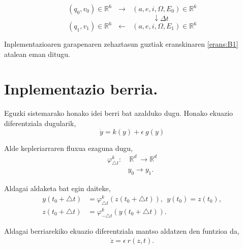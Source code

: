 \begin{equation*}
(q_0,v_0) \in \mathbb{R}^6 \ \ \ \longrightarrow \ \ \  (a,e,i,\Omega,E_0) \in \mathbb{R}^6 
\end{equation*}
\begin{equation*}
\quad \quad \quad \quad \quad \quad \quad \quad \downarrow \Delta t
\end{equation*}
\begin{equation*}
(q_1,v_1) \in \mathbb{R}^6 \ \ \ \longleftarrow \ \ \  (a,e,i,\Omega,E_1) \in \mathbb{R}^6 
\end{equation*}

Inplementazioaren garapenaren zehaztasun guztiak eranskinaren \ref{erans:B1} atalean eman ditugu.
 


\section{Inplementazio berria.}

Eguzki sistemarako honako idei berri bat azalduko dugu. Honako ekuazio diferentziala dugularik,
\begin{equation*}
\dot{y}=k(y)+\epsilon \ g(y)
\end{equation*}

Alde kepleriarraren fluxua ezaguna dugu,
\begin{align*}
\varphi_{\triangle t}^k:&  \ \mathbb{R}^d \ \longrightarrow \mathbb{R}^d  \\
&  y_0 \longrightarrow y_1. 
\end{align*}

Aldagai aldaketa bat egin daiteke,
\begin{align*}
y(t_0+\triangle t) &= \varphi _{\triangle t}^k(z(t_0+\triangle t)), \ \ y(t_0)=z(t_0), \\
z(t_0+\triangle t) &= \varphi _{-\triangle t}^k(y(t_0+\triangle t)).
\end{align*}

Aldagai berriarekiko ekuazio diferentziala mantso aldatzen den funtzioa da,
\begin{align*}
\dot{z}=\epsilon \ r(z,t).
\end{align*} 

